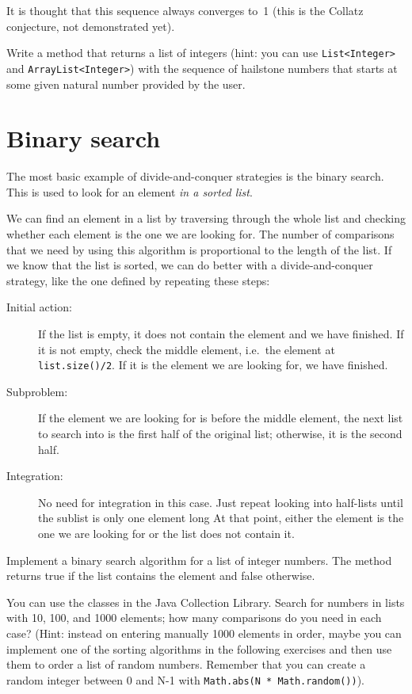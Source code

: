 \documentclass{article}
\begin{document}
It is thought that this sequence always converges 
to~1 (this is the Collatz conjecture,
not demonstrated yet). 

Write a method that returns a list of integers
(hint: you can use \verb+List<Integer>+ and \verb+ArrayList<Integer>+) 
with the sequence of hailstone numbers that starts at some
given natural number provided by the user. 

\section{Binary search}
\label{sec:binary-search}

The most basic example of divide-and-conquer strategies is the binary
search. This is used to look for an element \emph{in a sorted list}. 

We can find an element in a list by traversing through the whole list
and checking whether each element is the one we are looking for. The
number of comparisons that we need by using this algorithm is
proportional to the length of the list. If we know that the list is
sorted, we can do better with a divide-and-conquer strategy, 
like the one defined by repeating these steps: 

\begin{description}
\item[Initial action: ] If the list is empty, it does not contain the
  element and we have finished. 
  If it is not empty, check the middle element, i.e.~the
  element at \verb+list.size()/2+. If it is the element we are looking
  for, we have finished. 
\item[Subproblem: ] If the element we are looking for is before the
  middle element, the next list to search into is the first half of
  the original list; otherwise, it is the second half.
\item[Integration: ] No need for integration in this case. Just repeat
  looking into half-lists until the sublist is only one element long 
  At that point, either the element is the one we are looking for or
  the list does not contain it. 
\end{description}

Implement a binary search algorithm for a list of integer numbers. The
method returns true if the list contains the element and false
otherwise. 

You
can use the classes in the Java Collection Library. Search for numbers
in lists with 10, 100, and 1000 elements; how many comparisons do you
need in each case? (Hint: instead on entering manually 1000 elements
in order, maybe you can implement one of the sorting algorithms in the
following exercises and then use them to order a list of random
numbers. Remember that you can create a random integer between 0 and
N-1 with \verb+Math.abs(N * Math.random())+).
\end{document}
